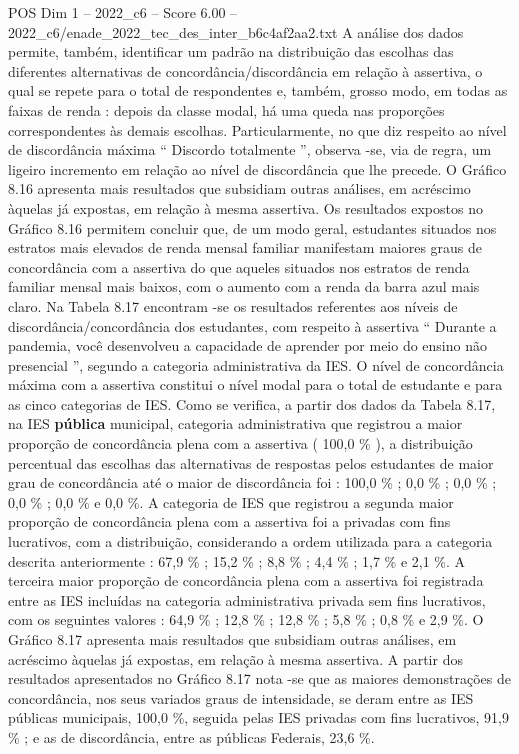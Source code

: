 \begin{textsample}{POS Dim 1 – 2022\_c6 – Score 6.00 – 2022\_c6/enade\_2022\_tec\_des\_inter\_b6c4af2aa2.txt}
A análise dos dados permite, também, identificar um padrão na distribuição das escolhas das diferentes alternativas de concordância/discordância em relação à assertiva, o qual se repete para o total de respondentes e, também, grosso modo, em todas as faixas de renda : depois da classe modal, há uma queda nas proporções correspondentes às demais escolhas.
Particularmente, no que diz respeito ao nível de discordância máxima “ Discordo totalmente ”, observa -se, via de regra, um ligeiro incremento em relação ao nível de discordância que lhe precede.
O Gráfico 8.16 apresenta mais resultados que subsidiam outras análises, em acréscimo àquelas já expostas, em relação à mesma assertiva.
Os resultados expostos no Gráfico 8.16 permitem concluir que, de um modo geral, estudantes situados nos estratos mais elevados de renda mensal familiar manifestam maiores graus de concordância com a assertiva do que aqueles situados nos estratos de renda familiar mensal mais baixos, com o aumento com a renda da barra azul mais claro.
Na Tabela 8.17 encontram -se os resultados referentes aos níveis de discordância/concordância dos estudantes, com respeito à assertiva “ Durante a pandemia, você desenvolveu a capacidade de aprender por meio do ensino não presencial ”, segundo a categoria administrativa da IES.
O nível de concordância máxima com a assertiva constitui o nível modal para o total de estudante e para as cinco categorias de IES.
Como se verifica, a partir dos dados da Tabela 8.17, na IES \textbf{pública} municipal, categoria administrativa que registrou a maior proporção de concordância plena com a assertiva ( 100,0 \% ), a distribuição percentual das escolhas das alternativas de respostas pelos estudantes de maior grau de concordância até o maior de discordância foi : 100,0 \% ; 0,0 \% ; 0,0 \% ; 0,0 \% ; 0,0 \% e 0,0 \%.
A categoria de IES que registrou a segunda maior proporção de concordância plena com a assertiva foi a privadas com fins lucrativos, com a distribuição, considerando a ordem utilizada para a categoria descrita anteriormente : 67,9 \% ; 15,2 \% ; 8,8 \% ; 4,4 \% ; 1,7 \% e 2,1 \%.
A terceira maior proporção de concordância plena com a assertiva foi registrada entre as IES incluídas na categoria administrativa privada sem fins lucrativos, com os seguintes valores : 64,9 \% ; 12,8 \% ; 12,8 \% ; 5,8 \% ; 0,8 \% e 2,9 \%.
O Gráfico 8.17 apresenta mais resultados que subsidiam outras análises, em acréscimo àquelas já expostas, em relação à mesma assertiva.
A partir dos resultados apresentados no Gráfico 8.17 nota -se que as maiores demonstrações de concordância, nos seus variados graus de intensidade, se deram entre as IES públicas municipais, 100,0 \%, seguida pelas IES privadas com fins lucrativos, 91,9 \% ; e as de discordância, entre as públicas Federais, 23,6 \%.

\end{textsample}
